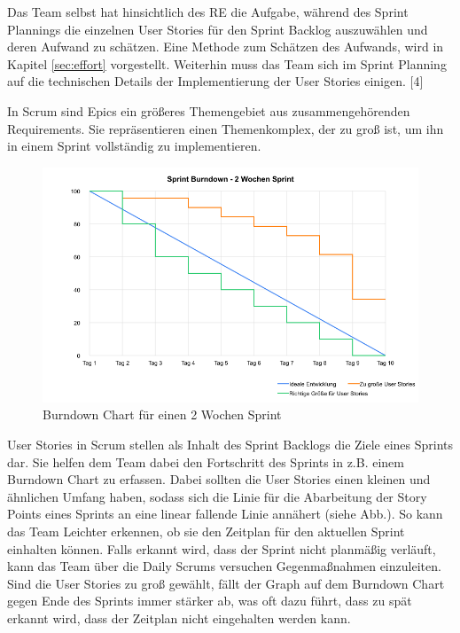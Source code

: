 \documentclass[acmtog]{acmart}
\begin{document}
Das Team selbst hat hinsichtlich des RE die Aufgabe, während des Sprint Plannings die einzelnen User Stories für den Sprint 
Backlog auszuwählen und deren Aufwand zu schätzen. Eine Methode zum Schätzen des Aufwands, wird in Kapitel \ref{sec:effort} vorgestellt. 
Weiterhin muss das Team sich im Sprint Planning auf die technischen Details der Implementierung der User Stories einigen. [4]

In Scrum sind Epics ein größeres Themengebiet aus zusammengehörenden Requirements. Sie repräsentieren einen Themenkomplex, der 
zu groß ist, um ihn in einem Sprint vollständig zu implementieren. \cite{reinscrum}

\begin{figure}[t]
  \centering
  \includegraphics[width=\linewidth]{images/sprint-burndown2.png}
  \caption{Burndown Chart für einen 2 Wochen Sprint}
    \label{fig:burndownchart}
  \Description{}
\end{figure}

User Stories in Scrum stellen als Inhalt des Sprint Backlogs die Ziele eines Sprints dar. Sie helfen dem Team dabei den Fortschritt 
des Sprints in z.B. einem Burndown Chart zu erfassen. Dabei sollten die User Stories einen kleinen und ähnlichen Umfang haben, sodass 
sich die Linie für die Abarbeitung der Story Points eines Sprints an eine linear fallende Linie annähert (siehe Abb.). So kann das 
Team Leichter erkennen, ob sie den Zeitplan für den aktuellen Sprint einhalten können. Falls erkannt wird, dass der Sprint nicht planmäßig 
verläuft, kann das Team über die Daily Scrums versuchen Gegenmaßnahmen einzuleiten. Sind die User Stories zu groß gewählt, fällt der 
Graph auf dem Burndown Chart gegen Ende des Sprints immer stärker ab, was oft dazu führt, dass zu spät erkannt wird, dass der Zeitplan 
nicht eingehalten werden kann. \cite{reinscrum} 
\end{document}
